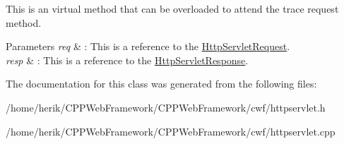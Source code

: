 This is an virtual method that can be overloaded to attend the trace request method. 


\begin{DoxyParams}{Parameters}
{\em req} & \+: This is a reference to the \hyperlink{class_http_servlet_request}{Http\+Servlet\+Request}. \\
\hline
{\em resp} & \+: This is a reference to the \hyperlink{class_http_servlet_response}{Http\+Servlet\+Response}. \\
\hline
\end{DoxyParams}


The documentation for this class was generated from the following files\+:\begin{DoxyCompactItemize}
\item 
/home/herik/\+C\+P\+P\+Web\+Framework/\+C\+P\+P\+Web\+Framework/cwf/httpservlet.\+h\item 
/home/herik/\+C\+P\+P\+Web\+Framework/\+C\+P\+P\+Web\+Framework/cwf/httpservlet.\+cpp\end{DoxyCompactItemize}
